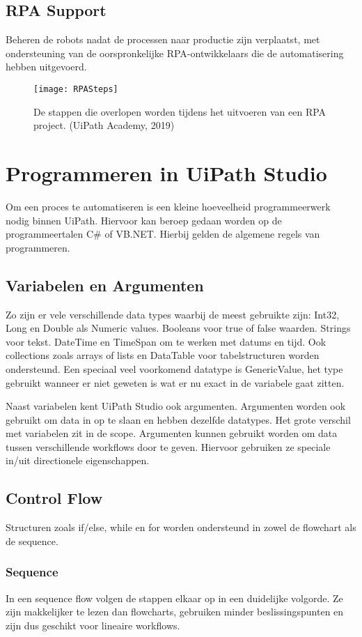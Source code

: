 \subsection{RPA Support}
Beheren de robots nadat de processen naar productie zijn verplaatst, met ondersteuning van de oorspronkelijke RPA-ontwikkelaars die de automatisering hebben uitgevoerd.

\begin{figure}
	\texttt{[image: RPASteps]}
	\caption{De stappen die overlopen worden tijdens het uitvoeren van een RPA project. (UiPath Academy, 2019)}
\end{figure}

\section{Programmeren in UiPath Studio}
Om een proces te automatiseren is een kleine hoeveelheid programmeerwerk nodig binnen UiPath. Hiervoor kan beroep gedaan worden op de programmeertalen C\# of VB.NET. Hierbij gelden de algemene regels van programmeren. 

\subsection{Variabelen en Argumenten}
Zo zijn er vele verschillende data types waarbij de meest gebruikte zijn: Int32, Long en Double als Numeric values. Booleans voor true of false waarden. Strings voor tekst. DateTime en TimeSpan om te werken met datums en tijd. Ook collections zoals arrays of lists en DataTable voor tabelstructuren worden ondersteund. Een speciaal veel voorkomend datatype is GenericValue, het type gebruikt wanneer er niet geweten is wat er nu exact in de variabele gaat zitten.

Naast variabelen kent UiPath Studio ook argumenten. Argumenten worden ook gebruikt om data in op te slaan en hebben dezelfde datatypes. Het grote verschil met variabelen zit in de scope. Argumenten kunnen gebruikt worden om data tussen verschillende workflows door te geven. Hiervoor gebruiken ze speciale in/uit directionele eigenschappen.

\subsection{Control Flow}
Structuren zoals if/else, while en for worden ondersteund in zowel de flowchart als de sequence.

\subsubsection{Sequence}
In een sequence flow volgen de stappen elkaar op in een duidelijke volgorde. Ze zijn makkelijker te lezen dan flowcharts, gebruiken minder beslissingspunten en zijn dus geschikt voor lineaire workflows.

